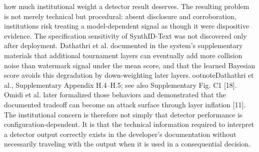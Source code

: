 \documentclass[11pt]{article}
\begin{document}
how much institutional weight a detector result deserves. The resulting problem is
not merely technical but procedural: absent disclosure and corroboration,
institutions risk treating a model-dependent signal as though it were dispositive
evidence.
The specification sensitivity of SynthID-Text was not discovered only after
deployment. Dathathri et al. documented in the system's supplementary materials
that additional tournament layers can eventually add more collision noise than
watermark signal under the mean score, and that the learned Bayesian score avoids
this degradation by down-weighting later layers.ootnote{Dathathri et al.,
Supplementary Appendix H.4--H.5; see also Supplementary Fig. C1 [18].} Omidi et
al. later formalized those behaviors and demonstrated that the documented tradeoff
can become an attack surface through layer inflation [11]. The institutional
concern is therefore not simply that detector performance is
configuration-dependent. It is that the technical information required to
interpret a detector output correctly exists in the developer's documentation
without necessarily traveling with the output when it is used in a consequential
decision.
\end{document}
